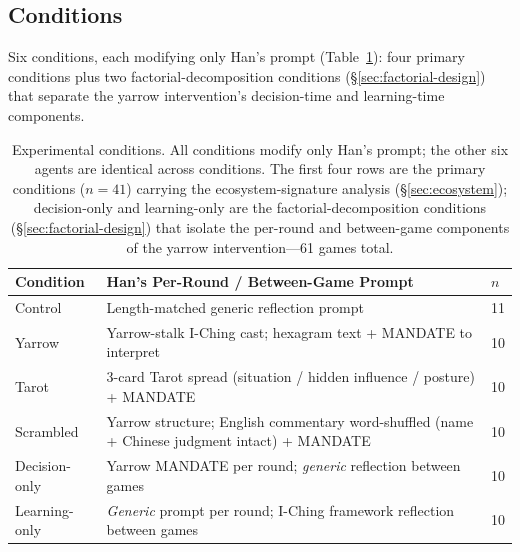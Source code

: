 \documentclass[11pt]{article}
\begin{document}
\subsection{Conditions}
\label{sec:conditions}

Six conditions, each modifying only Han's prompt (Table~\ref{tab:conditions}): four primary conditions plus two factorial-decomposition conditions (\S\ref{sec:factorial-design}) that separate the yarrow intervention's decision-time and learning-time components.

\begin{table}[h]
\centering
\caption{Experimental conditions. All conditions modify only Han's prompt; the other six agents are identical across conditions. The first four rows are the primary conditions ($n=41$) carrying the ecosystem-signature analysis (\S\ref{sec:ecosystem}); decision-only and learning-only are the factorial-decomposition conditions (\S\ref{sec:factorial-design}) that isolate the per-round and between-game components of the yarrow intervention---61 games total.}
\label{tab:conditions}
\begin{tabular}{lp{7.0cm}l}
\toprule
Condition & Han's Per-Round / Between-Game Prompt & $n$ \\
\midrule
Control & Length-matched generic reflection prompt & 11 \\
Yarrow & Yarrow-stalk I-Ching cast; hexagram text + \textsc{MANDATE} to interpret & 10 \\
Tarot & 3-card Tarot spread (situation / hidden influence / posture) + \textsc{MANDATE} & 10 \\
Scrambled & Yarrow structure; English commentary word-shuffled (name + Chinese judgment intact) + \textsc{MANDATE} & 10 \\
Decision-only & Yarrow \textsc{MANDATE} per round; \emph{generic} reflection between games & 10 \\
Learning-only & \emph{Generic} prompt per round; I-Ching framework reflection between games & 10 \\
\bottomrule
\end{tabular}
\end{table}
\end{document}
